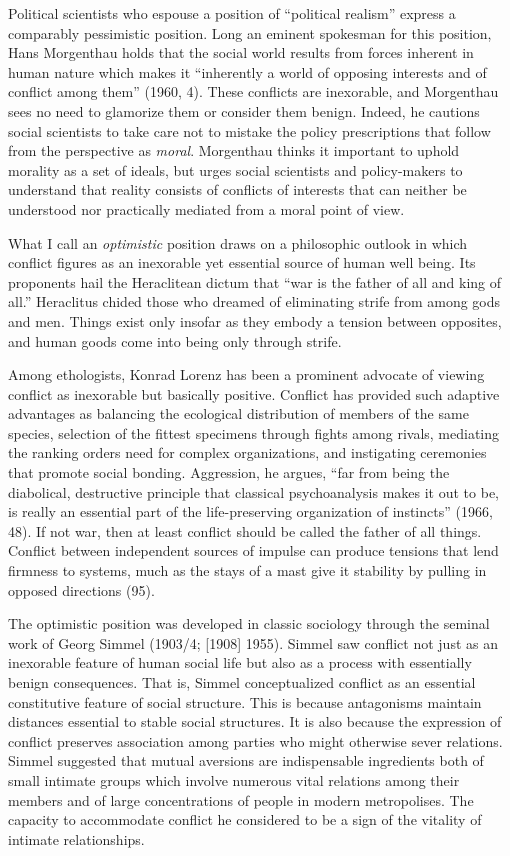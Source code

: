 Political scientists who espouse a position of ``political realism'' express a comparably pessimistic position. Long an eminent spokesman for this position, Hans \mbox{Morgenthau} holds that the social world results from forces inherent in human nature which makes it ``inherently a world of opposing interests and of conflict among them'' (1960, 4). These conflicts are inexorable, and \mbox{Morgenthau} sees no need to glamorize them or consider them benign. Indeed, he cautions social scientists to take care not to mistake the policy prescriptions that follow from the perspective as \emph{moral}. \mbox{Morgenthau} thinks it important to uphold morality as a set of ideals, but urges social scientists and policy-makers to understand that reality consists of conflicts of interests that can neither be understood nor practically mediated from a moral point of view.

What I call an \emph{optimistic} position draws on a philosophic outlook in which conflict figures as an inexorable yet essential source of human well being. Its proponents hail the Heraclitean dictum that ``war is the father of all and king of all.'' Heraclitus chided those who dreamed of eliminating strife from among gods and men. Things exist only insofar as they embody a tension between opposites, and human goods come into being only through strife.

Among ethologists, Konrad Lorenz has been a prominent advocate of viewing conflict as inexorable but basically positive. Conflict has provided such adaptive advantages as balancing the ecological distribution of members of the same species, selection of the fittest specimens through fights among rivals, mediating the ranking orders need for complex organizations, and instigating ceremonies that promote social bonding. Aggression, he argues, ``far from being the diabolical, destructive principle that classical psychoanalysis makes it out to be, is really an essential part of the life-preserving organization of instincts'' (1966, 48). If not war, then at least conflict should be called the father of all things. Conflict between independent sources of impulse can produce tensions that lend firmness to systems, much as the stays of a mast give it stability by pulling in opposed directions (95).

The optimistic position was developed in classic sociology through the seminal work of Georg Simmel (1903/4; [1908] 1955). Simmel saw conflict not just as an inexorable feature of human social life but also as a process with essentially benign consequences. That is, Simmel conceptualized conflict as an essential constitutive feature of social structure. This is because antagonisms maintain distances essential to stable social structures. It is also because the expression of conflict preserves association among parties who might otherwise sever relations. Simmel suggested that mutual aversions are indispensable ingredients both of small intimate groups which involve numerous vital relations among their members and of large concentrations of people in modern metropolises. The capacity to accommodate conflict he considered to be a sign of the vitality of intimate relationships.

